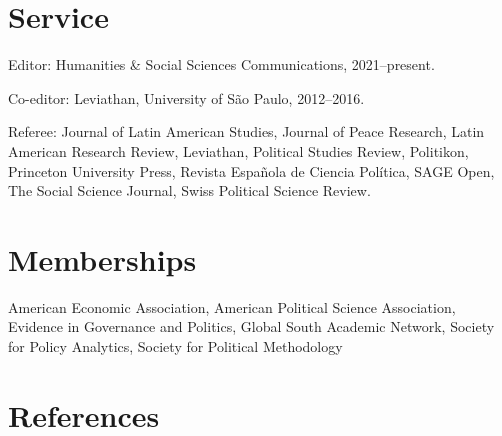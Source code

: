 \documentclass[a4paper]{article}
\renewenvironment{itemize}{
	\begin{list}{}{
			\setlength{\leftmargin}{1.5em}
		}
		}{
	\end{list}
}
\begin{document}

\section*{Service}

\begin{itemize}
\item Editor: Humanities \& Social Sciences Communications, 2021--present.
\item Co-editor: Leviathan, University of São Paulo, 2012--2016.
\item Referee: Journal of Latin American Studies, Journal of Peace Research, Latin American Research Review, Leviathan, Political Studies Review, Politikon, Princeton University Press, Revista Española de Ciencia Política, SAGE Open, The Social Science Journal, Swiss Political Science Review.
\end{itemize} 

\section*{Memberships}

\begin{itemize}
\item American Economic Association, American Political Science Association, Evidence in Governance and Politics, Global South Academic Network, Society for Policy Analytics, Society for Political Methodology
\end{itemize}

\section*{References}
\end{document}
